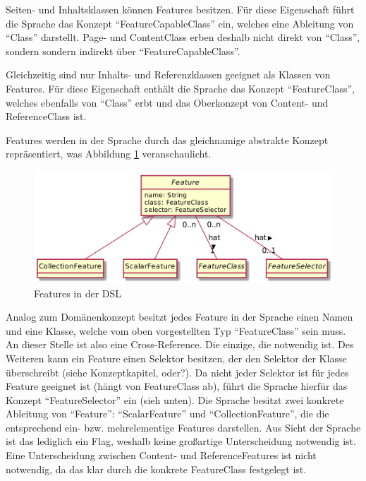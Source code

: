     Seiten- und Inhaltsklassen können Features besitzen.
    Für diese Eigenschaft führt die Sprache das Konzept "`FeatureCapableClass"' ein,
    welches eine Ableitung von "`Class"' darstellt.
    Page- und ContentClass erben deshalb nicht direkt von "`Class"',
    sondern sondern indirekt über "`FeatureCapableClass"'.

    Gleichzeitig sind nur Inhalts- und Referenzklassen geeignet als Klassen
    von Features. Für diese Eigenschaft enthält die Sprache das Konzept "`FeatureClass"',
    welches ebenfalls von "`Class"' erbt und das Oberkonzept von Content- und ReferenceClass ist.

    Features werden in der Sprache durch das gleichnamige abstrakte Konzept repräsentiert,
    was Abbildung \ref{image:dslFeatures} veranschaulicht.

    \begin{figure}[htb]
        \centering
        \includegraphics[scale=\imageScalingFactor]{../resources/dsl/features.png}
        \caption{Features in der DSL}
        \label{image:dslFeatures}
    \end{figure}

    Analog zum Domänenkonzept besitzt jedes Feature in der Sprache einen Namen
    und eine Klasse, welche vom oben vorgestellten Typ "`FeatureClass"' sein muss.
    An dieser Stelle ist also eine Cross-Reference. Die einzige, die notwendig ist.
    Des Weiteren kann ein Feature einen Selektor besitzen, der den Selektor der
    Klasse überschreibt (siehe Konzeptkapitel, oder?).
    Da nicht jeder Selektor ist für jedes Feature geeignet ist (hängt von FeatureClass ab),
    führt die Sprache hierfür das Konzept "`FeatureSelector"' ein (sieh unten).
    Die Sprache besitzt zwei konkrete Ableitung von "`Feature"':
    "`ScalarFeature"' und "`CollectionFeature"', die die entsprechend ein- bzw. mehrelementige Features darstellen.
    Aus Sicht der Sprache ist das lediglich ein Flag, weshalb keine großartige Unterscheidung notwendig ist.
    Eine Unterscheidung zwischen Content- und ReferenceFeatures ist nicht notwendig,
    da das klar durch die konkrete FeatureClass festgelegt ist.

